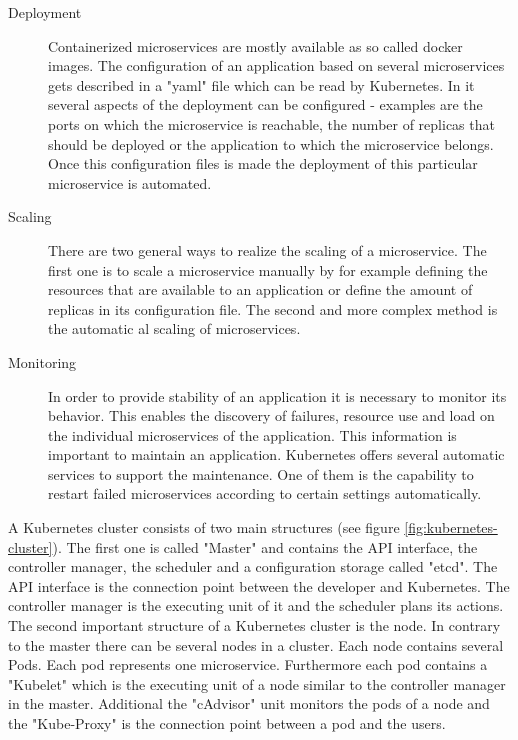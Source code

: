 \documentclass[
	ngerman,
	ruledheaders=section,%
	class=report,%
	thesis={type=master},%
	accentcolor=8c,%
	custommargins=false,%
	marginpar=false,%
	parskip=half-,%
	fontsize=11pt,%
]{tudapub}
\begin{document}
\begin{description}
\item[Deployment] Containerized microservices are mostly available as so called docker images. The configuration of an application based on several microservices gets described in a "yaml" file which can be read by Kubernetes. In it several aspects of the deployment can be configured - examples are the ports on which the microservice is reachable, the number of replicas that should be deployed or the application to which the microservice belongs. Once this configuration files is made the deployment of this particular microservice is automated. 
\item[Scaling] There are two general ways to realize the scaling of a microservice. The first one is to scale a microservice manually by for example defining the resources that are available to an application or define the amount of replicas in its configuration file. The second and more complex method is the automatic al scaling of microservices.
\item[Monitoring] In order to provide stability of an application it is necessary to monitor its behavior. This enables the discovery of failures, resource use and load on the individual microservices of the application. This information is important to maintain an application. Kubernetes offers several automatic services to support the maintenance. One of them is the capability to restart failed microservices according to certain settings automatically.
\end{description}

A Kubernetes cluster consists of two main structures (see figure \ref{fig:kubernetes-cluster}). The first one is called "Master" and contains the API interface, the controller manager, the scheduler and a configuration storage called "etcd". The API interface is the connection point between the developer and Kubernetes. The controller manager is the executing unit of it and the scheduler plans its actions.\\ The second important structure of a Kubernetes cluster is the node. In contrary to the master there can be several nodes in a cluster. Each node contains several Pods. Each pod represents one microservice. Furthermore each pod contains a "Kubelet" which is the executing unit of a node similar to the controller manager in the master. Additional the "cAdvisor" unit monitors the pods of a node and the "Kube-Proxy" is the connection point between a pod and the users.\\
\end{document}
